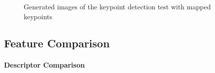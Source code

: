 \documentclass[12pt, titlepage]{article}
\begin{document}
\begin{enumerate}
\begin{figure}[h!]
  \centering
  \hfill
  \caption{Generated images of the keypoint detection test with mapped keypoints}
  \label{fig-FD-AR}
\end{figure}
\end{enumerate}




\subsection{Feature Comparison}
\paragraph{Descriptor Comparison} 
\end{document}

